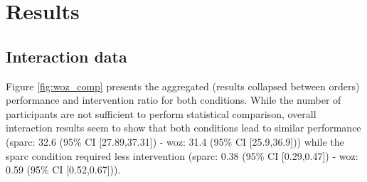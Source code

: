 \section{Results}

\subsection{Interaction data}

Figure \ref{fig:woz_comp} presents the aggregated (results collapsed between orders) performance and intervention ratio for both conditions. While the number of participants are not sufficient to perform statistical comparison, overall interaction results seem to show that both conditions lead to similar performance (\gls{sparc}: 32.6 (95\% CI [27.89,37.31]) - \gls{woz}: 31.4 (95\% CI [25.9,36.9])) while the \gls{sparc} condition required less intervention (\gls{sparc}: 0.38 (95\% CI [0.29,0.47]) - \gls{woz}: 0.59 (95\% CI [0.52,0.67])).

